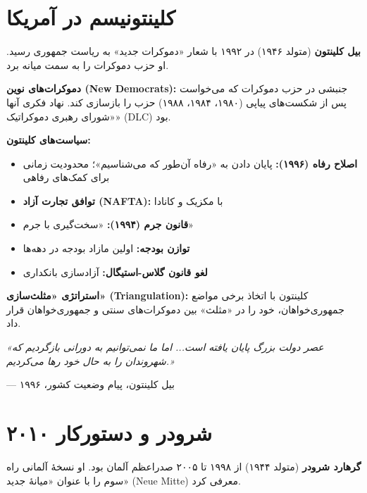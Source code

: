 \section{کلینتونیسم در آمریکا}


\textbf{بیل کلینتون} (متولد ۱۹۴۶) در ۱۹۹۲ با شعار «دموکرات جدید» به ریاست جمهوری رسید. او حزب دموکرات را به سمت میانه برد.

\textbf{دموکرات‌های نوین (New Democrats):}
جنبشی در حزب دموکرات که می‌خواست پس از شکست‌های پیاپی (۱۹۸۰، ۱۹۸۴، ۱۹۸۸) حزب را بازسازی کند. نهاد فکری آنها «شورای رهبری دموکراتیک» (DLC) بود.

\textbf{سیاست‌های کلینتون:}
\begin{itemize}
    \item \textbf{اصلاح رفاه (۱۹۹۶):} پایان دادن به «رفاه آن‌طور که می‌شناسیم»؛ محدودیت زمانی برای کمک‌های رفاهی
    \item \textbf{توافق تجارت آزاد (NAFTA):} با مکزیک و کانادا
    \item \textbf{قانون جرم (۱۹۹۴):} «سخت‌گیری با جرم»
    \item \textbf{توازن بودجه:} اولین مازاد بودجه در دهه‌ها
    \item \textbf{لغو قانون گلاس-استیگال:} آزادسازی بانکداری
\end{itemize}

\textbf{استراتژی «مثلث‌سازی» (Triangulation):}
کلینتون با اتخاذ برخی مواضع جمهوری‌خواهان، خود را در «مثلث» بین دموکرات‌های سنتی و جمهوری‌خواهان قرار داد.


\begin{tcolorbox}[
    enhanced,
    colback=centergreen!10,
    colframe=centergreen,
    boxrule=1.5pt,
    arc=5pt,
    fonttitle=\bfseries,
    title={\rl{🟢 نقل‌قول: بیل کلینتون}}
]
\textit{«عصر دولت بزرگ پایان یافته است... اما ما نمی‌توانیم به دورانی بازگردیم که شهروندان را به حال خود رها می‌کردیم.»}

\hfill --- بیل کلینتون، پیام وضعیت کشور، ۱۹۹۶
\end{tcolorbox}

\section{شرودر و دستورکار ۲۰۱۰}


\textbf{گرهارد شرودر} (متولد ۱۹۴۴) از ۱۹۹۸ تا ۲۰۰۵ صدراعظم آلمان بود. او نسخهٔ آلمانی راه سوم را با عنوان «میانهٔ جدید» (Neue Mitte) معرفی کرد.

